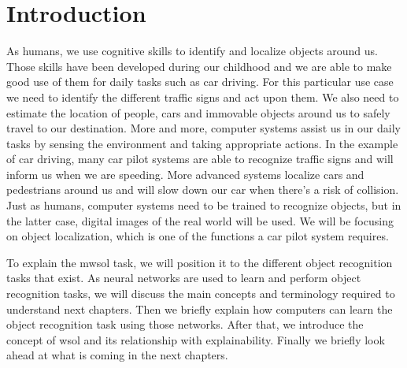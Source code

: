 \chapter{Introduction}

As humans, we use cognitive skills to identify and localize objects around us. Those skills have been developed during our childhood and we are able to make good use of them for daily tasks such as car driving. For this particular use case we need to identify the different traffic signs and act upon them. We also need to estimate the location of people, cars and immovable objects around us to safely travel to our destination. More and more, computer systems assist us in our daily tasks by sensing the environment and taking appropriate actions. In the example of car driving, many car pilot systems are able to recognize traffic signs and will inform us when we are speeding. More advanced systems localize cars and pedestrians around us and will slow down our car when there's a risk of collision. Just as humans, computer systems need to be trained to recognize objects, but in the latter case, digital images of the real world will be used. We will be focusing on object localization, which is one of the functions a car pilot system requires.

To explain the \acrfull{mwsol} task, we will position it to the different object recognition tasks that exist. As neural networks are used to learn and perform object recognition tasks, we will discuss the main concepts and terminology required to understand next chapters. Then we briefly explain how computers can learn the object recognition task using those networks. After that, we introduce the concept of \acrlong{wsol} and its relationship with explainability. Finally we briefly look ahead at what is coming in the next chapters.

